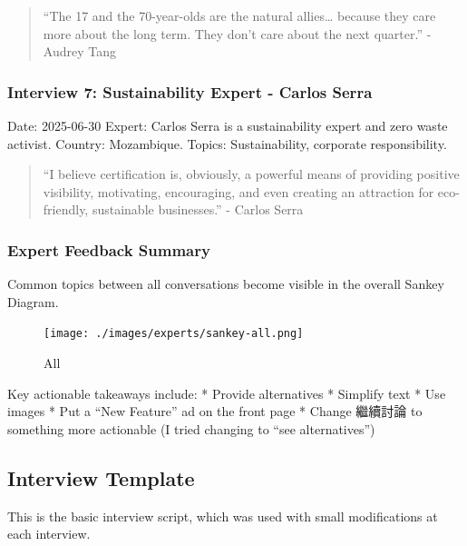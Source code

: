 \documentclass[
  12pt,
  letterpaper,
  DIV=11,
  numbers=noendperiod]{scrartcl}
\begin{document}
\begin{quote}
``The 17 and the 70-year-olds are the natural allies\ldots{} because
they care more about the long term. They don't care about the next
quarter.'' - Audrey Tang
\end{quote}

\subsubsection{Interview 7: Sustainability Expert - Carlos
Serra}\label{interview-7-sustainability-expert---carlos-serra}

Date: 2025-06-30 Expert: Carlos Serra is a sustainability expert and
zero waste activist. Country: Mozambique. Topics: Sustainability,
corporate responsibility.

\begin{quote}
``I believe certification is, obviously, a powerful means of providing
positive visibility, motivating, encouraging, and even creating an
attraction for eco-friendly, sustainable businesses.'' - Carlos Serra
\end{quote}

\subsubsection{Expert Feedback Summary}\label{expert-feedback-summary}

Common topics between all conversations become visible in the overall
Sankey Diagram.

\begin{figure}[H]

{\centering \texttt{[image: ./images/experts/sankey-all.png]}

}

\caption{All}

\end{figure}%

Key actionable takeaways include: * Provide alternatives * Simplify text
* Use images * Put a ``New Feature'' ad on the front page * Change
繼續討論 to something more actionable (I tried changing to ``see
alternatives'')

\newpage

\subsection{Interview Template}\label{interview-template}

This is the basic interview script, which was used with small
modifications at each interview.
\end{document}
